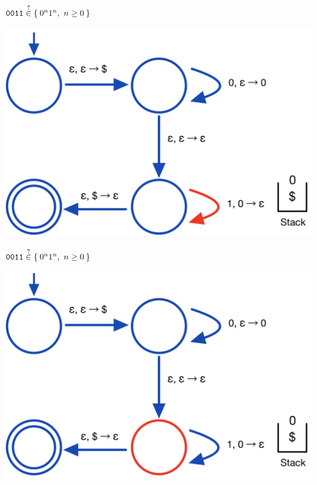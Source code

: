 \documentclass[aspectratio=169]{beamer}
\begin{document}
\begin{frame}{$\texttt{0011} \stackrel{?}{\in} \Set{0^n 1^n,\ n \geq 0}$}
    \begin{center}
        \includegraphics[scale=0.30]{images/pda_comp/PDA_Comp_10.png}
    \end{center}
\end{frame}

\begin{frame}{$\texttt{0011} \stackrel{?}{\in} \Set{0^n 1^n,\ n \geq 0}$}
    \begin{center}
        \includegraphics[scale=0.30]{images/pda_comp/PDA_Comp_11.png}
    \end{center}
\end{frame}
\end{document}
